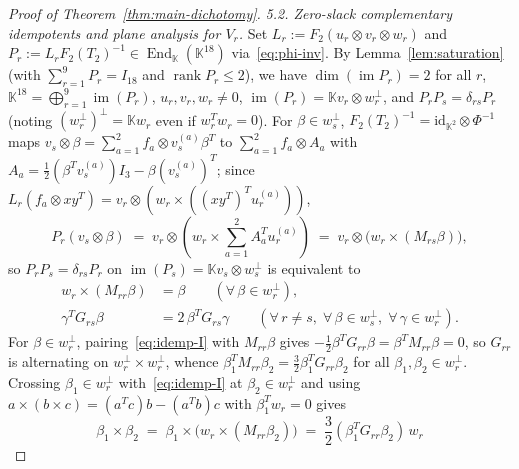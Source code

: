 \documentclass[11pt,reqno]{amsart}
\theoremstyle{definition}
\theoremstyle{remark}
\numberwithin{equation}{section}
\newcommand{\KK}{\mathbb{K}}
\DeclareMathOperator{\rk}{rank}
\DeclareMathOperator{\End}{End}
\DeclareMathOperator{\im}{im}
\begin{document}
\begin{proof}[Proof of Theorem~\ref{thm:main-dichotomy}]
\emph{5.2. Zero-slack complementary idempotents and plane analysis for $V_r$.}
Set $L_r := F_2(u_r \otimes v_r \otimes w_r)$ and $P_r := L_r F_2(T_2)^{-1} \in \End_{\KK}(\KK^{18})$ via~\eqref{eq:phi-inv}. By Lemma~\ref{lem:saturation} (with $\sum_{r=1}^9 P_r = I_{18}$ and $\rk P_r \le 2$), we have $\dim(\im P_r) = 2$ for all $r$, $\KK^{18} = \bigoplus_{r=1}^9 \im(P_r)$, $u_r, v_r, w_r \neq 0$, $\im(P_r) = \KK v_r \otimes w_r^\perp$, and $P_r P_s = \delta_{rs} P_r$ (noting $(w_r^\perp)^\perp = \KK w_r$ even if $w_r^T w_r = 0$). For $\beta \in w_s^\perp$, $F_2(T_2)^{-1} = \mathrm{id}_{\KK^2} \otimes \Phi^{-1}$ maps $v_s \otimes \beta = \sum_{a=1}^2 f_a \otimes v_s^{(a)}\beta^T$ to $\sum_{a=1}^2 f_a \otimes A_a$ with $A_a = \frac{1}{2}(\beta^T v_s^{(a)})I_3 - \beta(v_s^{(a)})^T$; since $L_r(f_a \otimes x y^T) = v_r \otimes (w_r \times ((x y^T)^T u_r^{(a)}))$,
\[
  P_r(v_s \otimes \beta) \;=\; v_r \otimes \left(w_r \times \sum_{a=1}^2 A_a^T u_r^{(a)}\right) \;=\; v_r \otimes \bigl(w_r \times (M_{rs}\beta)\bigr),
\]
so $P_r P_s = \delta_{rs} P_r$ on $\im(P_s) = \KK v_s \otimes w_s^\perp$ is equivalent to
\begin{align}
  w_r \times (M_{rr}\beta) &= \beta \qquad (\forall\, \beta \in w_r^\perp), \label{eq:idemp-I}\\
  \gamma^T G_{rs}\beta &= 2\,\beta^T G_{rs}\gamma \qquad (\forall\, r \neq s,\; \forall\, \beta \in w_s^\perp,\; \forall\, \gamma \in w_r^\perp). \label{eq:idemp-II}
\end{align}
For $\beta \in w_r^\perp$, pairing~\eqref{eq:idemp-I} with $M_{rr}\beta$ gives $-\frac{1}{2}\beta^T G_{rr}\beta = \beta^T M_{rr}\beta = 0$, so $G_{rr}$ is alternating on $w_r^\perp \times w_r^\perp$, whence $\beta_1^T M_{rr}\beta_2 = \frac{3}{2}\beta_1^T G_{rr}\beta_2$ for all $\beta_1, \beta_2 \in w_r^\perp$. Crossing $\beta_1 \in w_r^\perp$ with~\eqref{eq:idemp-I} at $\beta_2 \in w_r^\perp$ and using $a \times (b \times c) = (a^T c)b - (a^T b)c$ with $\beta_1^T w_r = 0$ gives
\begin{equation}\label{eq:diag-cross}
  \beta_1 \times \beta_2 \;=\; \beta_1 \times \bigl(w_r \times (M_{rr}\beta_2)\bigr) \;=\; \frac{3}{2}(\beta_1^T G_{rr}\beta_2)\, w_r
\end{equation}

\end{proof}
\end{document}
